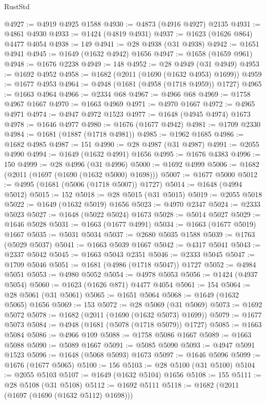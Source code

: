 \begin{lexlean}{RustStd}
\begin{coremodule}
@4927 := @4919 @4925 @1588
@4930 := @4873 (@4916 @4927) @2135
@4931 := @4861 @4930
@4933 := @1424 (@4819 @4931)
@4937 := @1623 (@1626 @864) @4477 @4054
@4938 := 149
@4941 := @28 @4938 (@31 @4938)
@4942 := @1651 @4941
@4945 := @1649 (@1632 @4942) @1656
@4947 := @1658 (@1659 @961)
@4948 := @1676 @2238
@4949 := 148
@4952 := @28 @4949 (@31 @4949)
@4953 := @1692 @4952
@4958 := @1682 (@2011 (@1690 (@1632 @4953) @1699))
@4959 := @1677 @4953
@4964 := @4948 (@1681 (@4958 (@1718 @4959)) @1727)
@4965 := @1663 @4964
@4966 := @2334 @68
@4967 := @4966 @68
@4969 := @1758 @4967 @1667
@4970 := @1663 @4969
@4971 := @4970 @1667
@4972 := @4965 @4971
@4974 := @4947 @4972 @1523
@4977 := @1648 (@4945 @4974) @1673
@4978 := @1646 @4977
@4980 := @1676 (@1677 @4942)
@4981 := @1709 @2330
@4984 := @1681 (@1887 (@1718 @4981))
@4985 := @1962 @1685
@4986 := @1682 @4985
@4987 := 151
@4990 := @28 @4987 (@31 @4987)
@4991 := @2055 @4990
@4994 := @1649 (@1632 @4991) @1656
@4995 := @1676 @4383
@4996 := 150
@4999 := @28 @4996 (@31 @4996)
@5000 := @1692 @4999
@5006 := @1682 (@2011 (@1697 (@1690 (@1632 @5000) @1698)))
@5007 := @1677 @5000
@5012 := @4995 (@1681 (@5006 (@1718 @5007)) @1727)
@5014 := @1648 (@4994 @5012)
@5015 := 152
@5018 := @28 @5015 (@31 @5015)
@5019 := @2055 @5018
@5022 := @1649 (@1632 @5019) @1656
@5023 := @4970 @2347
@5024 := @2333 @5023
@5027 := @1648 (@5022 @5024) @1673
@5028 := @5014 @5027
@5029 := @1646 @5028
@5031 := @1663 (@1677 @4991)
@5034 := @1663 (@1677 @5019) @1667
@5035 := @5031 @5034
@5037 := @2680 @5035 @1588
@5039 := @1763 (@5029 @5037)
@5041 := @1663 @5039 @1667
@5042 := @4317 @5041
@5043 := @2337 @5042
@5045 := @1663 @5043 @2351
@5046 := @2333 @5045
@5047 := @1709 @5046
@5051 := @1681 (@4986 (@1718 @5047)) @1727
@5052 := @4984 @5051
@5053 := @4980 @5052
@5054 := @4978 @5053
@5056 := @1424 (@4937 @5054)
@5060 := @1623 (@1626 @871) @4477 @4054
@5061 := 154
@5064 := @28 @5061 (@31 @5061)
@5065 := @1651 @5064
@5068 := @1649 (@1632 @5065) @1656
@5069 := 153
@5072 := @28 @5069 (@31 @5069)
@5073 := @1692 @5072
@5078 := @1682 (@2011 (@1690 (@1632 @5073) @1699))
@5079 := @1677 @5073
@5084 := @4948 (@1681 (@5078 (@1718 @5079)) @1727)
@5085 := @1663 @5084
@5086 := @4966 @109
@5088 := @1758 @5086 @1667
@5089 := @1663 @5088
@5090 := @5089 @1667
@5091 := @5085 @5090
@5093 := @4947 @5091 @1523
@5096 := @1648 (@5068 @5093) @1673
@5097 := @1646 @5096
@5099 := @1676 (@1677 @5065)
@5100 := 156
@5103 := @28 @5100 (@31 @5100)
@5104 := @2055 @5103
@5107 := @1649 (@1632 @5104) @1656
@5108 := 155
@5111 := @28 @5108 (@31 @5108)
@5112 := @1692 @5111
@5118 := @1682 (@2011 (@1697 (@1690 (@1632 @5112) @1698)))

\end{coremodule}
\end{lexlean}
